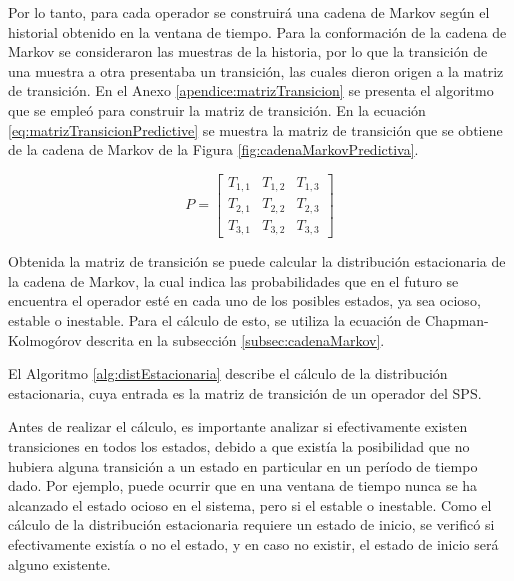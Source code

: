 Por lo tanto, para cada operador se construirá una cadena de Markov según el historial obtenido en la ventana de tiempo. Para la conformación de la cadena de Markov se consideraron las muestras de la historia, por lo que la transición de una muestra a otra presentaba un transición, las cuales dieron origen a la matriz de transición. En el Anexo \ref{apendice:matrizTransicion} se presenta el algoritmo que se empleó para construir la matriz de transición. En la ecuación \ref{eq:matrizTransicionPredictive} se muestra la matriz de transición que se obtiene de la cadena de Markov de la Figura \ref{fig:cadenaMarkovPredictiva}.

\begin{equation} \label{eq:matrizTransicionPredictive}
	P =
	\begin{bmatrix}
		T_{1,1} & T_{1,2} & T_{1,3} \\
		T_{2,1} & T_{2,2} & T_{2,3} \\
		T_{3,1} & T_{3,2} & T_{3,3}
	\end{bmatrix}	
\end{equation}

Obtenida la matriz de transición se puede calcular la distribución estacionaria de la cadena de Markov, la cual indica las probabilidades que en el futuro se encuentra el operador esté en cada uno de los posibles estados, ya sea ocioso, estable o inestable. Para el cálculo de esto, se utiliza la ecuación de Chapman-Kolmogórov \citep{Papoulis1984} descrita en la subsección \ref{subsec:cadenaMarkov}.

El Algoritmo \ref{alg:distEstacionaria} describe el cálculo de la distribución estacionaria, cuya entrada es la matriz de transición de un operador del SPS. 

Antes de realizar el cálculo, es importante analizar si efectivamente existen transiciones en todos los estados, debido a que existía la posibilidad que no hubiera alguna transición a un estado en particular en un período de tiempo dado. Por ejemplo, puede ocurrir que en una ventana de tiempo nunca se ha alcanzado el estado ocioso en el sistema, pero si el estable o inestable. Como el cálculo de la distribución estacionaria requiere un estado de inicio, se verificó si efectivamente existía o no el estado, y en caso no existir, el estado de inicio será alguno existente.

